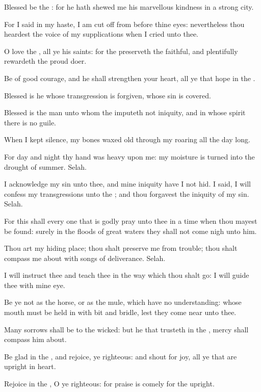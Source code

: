 \Verse Blessed be the \LORD: for he hath shewed me his marvellous kindness in a strong city.

\Verse For I said in my haste, I am cut off from before thine eyes: nevertheless thou heardest the voice of my supplications when I cried unto thee.

\Verse O love the \LORD, all ye his saints: for the \LORD preserveth the faithful, and plentifully rewardeth the proud doer.

\Verse Be of good courage, and he shall strengthen your heart, all ye that hope in the \LORD.




\Chapter
\Verse Blessed is he whose transgression is forgiven, whose sin is covered.

\Verse Blessed is the man unto whom the \LORD imputeth not iniquity, and in whose spirit there is no guile.

\Verse When I kept silence, my bones waxed old through my roaring all the day long.

\Verse For day and night thy hand was heavy upon me: my moisture is turned into the drought of summer. Selah.

\Verse I acknowledge my sin unto thee, and mine iniquity have I not hid.  I said, I will confess my transgressions unto the \LORD; and thou forgavest the iniquity of my sin. Selah.

\Verse For this shall every one that is godly pray unto thee in a time when thou mayest be found: surely in the floods of great waters they shall not come nigh unto him.

\Verse Thou art my hiding place; thou shalt preserve me from trouble; thou shalt compass me about with songs of deliverance. Selah.

\Verse I will instruct thee and teach thee in the way which thou shalt go: I will guide thee with mine eye.

\Verse Be ye not as the horse, or as the mule, which have no understanding: whose mouth must be held in with bit and bridle, lest they come near unto thee.

\Verse Many sorrows shall be to the wicked: but he that trusteth in the \LORD, mercy shall compass him about.

\Verse Be glad in the \LORD, and rejoice, ye righteous: and shout for joy, all ye that are upright in heart.




\Chapter
\Verse Rejoice in the \LORD, O ye righteous: for praise is comely for the upright.

